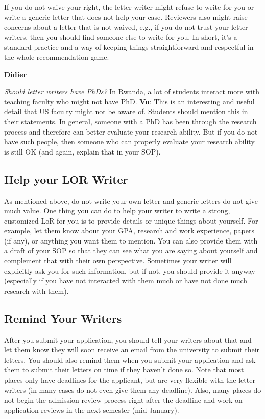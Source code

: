 \documentclass[oneside,11pt,dvipsnames]{book}
\newenvironment{commentbox}[1][]{
  \small
  \begin{mybox}
    {\small \textbf{#1}}
  }{
  \end{mybox}
}
\begin{document}
If you do not waive your right,  the letter writer might refuse to write for you or write a generic letter that does not help your case.  Reviewers also might raise concerns about a letter that is not waived, e.g., if you do not trust your letter writers, then you should find someone else to write for you. In short, it's a standard practice and a way of keeping things straightforward and respectful in the whole recommendation game.

\begin{commentbox}[Didier]
  \emph{Should letter writers have PhDs?}  In Rwanda, a lot of students interact more with teaching faculty who might not have PhD.
  \tcblower
  \textbf{Vu}: This is an interesting and useful detail that US faculty might not be aware of. Students should mention this in their statements. In general, someone with a PhD has been through the research process and therefore can better evaluate your research ability.  But if you do not have such people, then someone who can properly evaluate your research ability is still OK (and again, explain that in your SOP).
\end{commentbox}


\subsection{Help your LOR Writer} As mentioned above, do not write your own letter and generic letters do not give much value. One thing you can do to help your writer to write a strong, customized LoR for you is to provide details or unique things about yourself. For example, let them know about your GPA, research and work experience, papers (if any), or anything you want them to mention. You can also provide them with a draft of your SOP so that they can see what you are saying about yourself and complement that with their own perspective.
Sometimes your writer will explicitly ask you for such information, but if not, you should provide it anyway (especially if you have not interacted with them much or have not done much research with them).


\subsection{Remind Your Writers} After you submit your application, you should tell your writers about that and let them know they will soon receive an email from the university to submit their letters.  You should also remind them when you submit your application and ask them to submit their letters on time if they haven't done so.  Note that most places only have deadlines for the applicant, but are very flexible with the letter writers (in many cases do not even give them any deadline).  Also, many places do not begin the admission review process right after the deadline and work on application reviews in the next semester (mid-January).  
\end{document}
